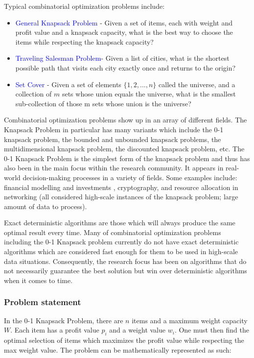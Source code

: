 \documentclass[titlepage]{article}
\begin{document}
Typical combinatorial optimization problems include:
\begin{itemize}
    \item \textcolor{blue}{General Knapsack Problem} - Given a set of items, each with weight and profit value and a knapsack capacity, what is the best way to choose the items while respecting the knapsack capacity?
    \item \textcolor{blue}{Traveling Salesman Problem}- Given a list of cities, what is the shortest possible path that visits each city exactly once and returns to the origin?
    \item \textcolor{blue}{Set Cover} - Given a set of elements $\{1, 2, ..., n\}$ called the universe, and a collection of $m$ sets whose union equals the universe, what is the smallest sub-collection of those m sets whose union is the universe?
\end{itemize}

Combinatorial optimization problems show up in an array of different fields. The Knapsack Problem in particular has many variants which include the 0-1 knapsack problem, the bounded and unbounded knapsack problems, the multidimensional knapsack problem, the discounted knapsack problem, etc. The 0-1 Knapsack Problem is the simplest form of the knapsack problem and thus has also been in the main focus within the research community. It appears in real-world decision-making processes in a variety of fields. Some examples include: financial modelling and investments \cite{finance}, cryptography, and resource allocation in networking \cite{resource} (all considered high-scale instances of the knapsack problem; large amount of data to process).

Exact deterministic algorithms are those which will always produce the same optimal result every time. Many of combinatorial optimization problems including the 0-1 Knapsack problem currently do not have exact deterministic algorithms which are considered fast enough for them to be used in high-scale data situations. Consequently, the research focus has been on algorithms that do not necessarily guarantee the best solution but win over deterministic algorithms when it comes to time. 

\subsubsection*{Problem statement}
In the 0-1 Knapsack Problem, there are $n$ items and a maximum weight capacity $W$. Each item has a profit value $p_i$ and a weight value $w_i$. One must then find the optimal selection of items which maximizes the profit value while respecting the max weight value. The problem can be mathematically represented as such:
\end{document}
